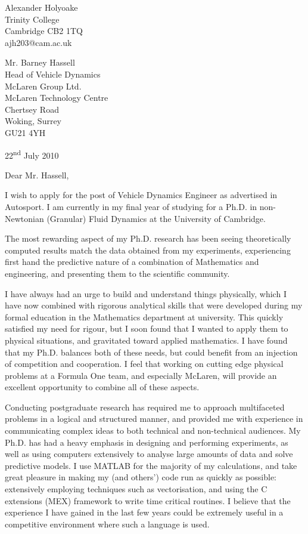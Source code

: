 \documentclass[a4paper,10pt]{article}
\begin{document}
\begin{flushright}
Alexander Holyoake \\ Trinity College \\ Cambridge CB2 1TQ \\ ajh203@cam.ac.uk
\end{flushright}

\begin{flushleft} 
Mr. Barney Hassell \\ Head of Vehicle Dynamics \\ McLaren Group Ltd. \\ McLaren Technology Centre \\ Chertsey Road \\ Woking, Surrey \\ GU21 4YH
\end{flushleft}

\begin{flushright}
22\textsuperscript{nd} July 2010
\end{flushright}


\noindent Dear Mr. Hassell,

I wish to apply for the post of Vehicle Dynamics Engineer as advertised in Autosport. I am currently in my final year of studying for a Ph.D. in non-Newtonian (Granular) Fluid Dynamics at the University of Cambridge.

The most rewarding aspect of my Ph.D. research has been seeing theoretically computed results match the data obtained from my experiments, experiencing first hand the predictive nature of a combination of Mathematics and engineering, and presenting them to the scientific community.

I have always had an urge to build and understand things physically, which I have now combined with rigorous analytical skills that were developed during my formal education in the Mathematics department at university. This quickly satisfied my need for rigour, but I soon found that I wanted to apply them to physical situations, and gravitated toward applied mathematics. I have found that my Ph.D. balances both of these needs, but could benefit from an injection of competition and cooperation. I feel that working on cutting edge physical problems at a Formula One team, and especially McLaren, will provide an excellent opportunity to combine all of these aspects.

Conducting postgraduate research has required me to approach multifaceted problems in a logical and structured manner, and provided me with experience in communicating complex ideas to both technical and non-technical audiences. My Ph.D. has had a heavy emphasis in designing and performing experiments, as well as using computers extensively to analyse large amounts of data and solve predictive models. I use MATLAB for the majority of my calculations, and take great pleasure in making my (and others') code run as quickly as possible: extensively employing techniques such as vectorisation, and using the C extensions (MEX) framework to write time critical routines. I believe that the experience I have gained in the last few years could be extremely useful in a competitive environment where such a language is used. 
 
\end{document}
